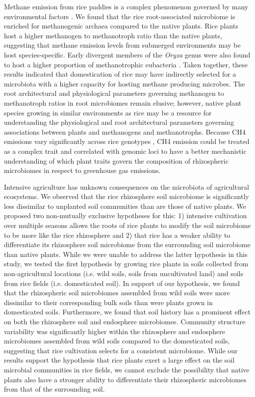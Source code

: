 Methane emission from rice paddies is a complex phenomenon governed by many environmental factors \cite{Minami1994}. We found that the rice root-associated microbiome is enriched for methanogenic archaea compared to the native plants. Rice plants host a higher methanogen to methanotroph ratio than the native plants, suggesting that methane emission levels from submerged environments may be host species-specific. Early divergent members of the \textit{Oryza} genus were also found to host a higher proportion of methanotrophic eubacteria \cite{Shenton2016}. Taken together, these results indicated that domestication of rice may have indirectly selected for a microbiota with a higher capacity for hosting methane producing microbes. The root architectural and physiological parameters governing methanogen to methanotroph ratios in root microbiomes remain elusive; however, native plant species growing in similar environments as rice may be a resource for understanding the physiological and root architectural parameters governing associations between plants and methanogens and methanotrophs. Because CH4 emissions vary significantly across rice genotypes \cite{Simmonds2015}, CH4 emission could be treated as a complex trait and correlated with genomic loci to have a better mechanistic understanding of which plant traits govern the composition of rhizospheric microbiomes in respect to greenhouse gas emissions.

Intensive agriculture has unknown consequences on the microbiota of agricultural ecosystems. We observed that the rice rhizosphere soil microbiome is significantly less dissimilar to unplanted soil communities than are those of native plants. We proposed two non-mutually exclusive hypotheses for this: 1) intensive cultivation over multiple seasons allows the roots of rice plants to modify the soil microbiome to be more like the rice rhizosphere and 2) that rice has a weaker ability to differentiate its rhizosphere soil microbiome from the surrounding soil microbiome than native plants. While we were unable to address the latter hypothesis in this study, we tested the first hypothesis by growing rice plants in soils collected from non-agricultural locations (i.e. wild soils, soils from uncultivated land) and soils from rice fields (i.e. domesticated soil). In support of our hypothesis, we found that the rhizospheric soil microbiomes assembled from wild soils were more dissimilar to their corresponding bulk soils than were plants grown in domesticated soils. Furthermore, we found that soil history has a prominent effect on both the rhizosphere soil and endosphere microbiomes. Community structure variability was significantly higher within the rhizosphere and endosphere microbiomes assembled from wild soils compared to the domesticated soils, suggesting that rice cultivation selects for a consistent microbiome. While our results support the hypothesis that rice plants exert a large effect on the soil microbial communities in rice fields, we cannot exclude the possibility that native plants also have a stronger ability to differentiate their rhizospheric microbiomes from that of the surrounding soil. 

